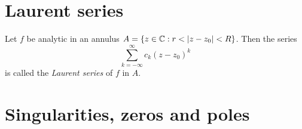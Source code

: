 \section{Laurent series}

\begin{definition}
    Let \(f\) be analytic in an annulus \(A = \{z \in \mathbb{C} : r < \left\lvert z - z_0 \right\rvert < R\}\). Then the series
    \[
        \sum_{k = -\infty}^\infty c_k (z - z_0)^k
    \]
    is called the \emph{Laurent series} of \(f\) in \(A\).
\end{definition}

\section{Singularities, zeros and poles}